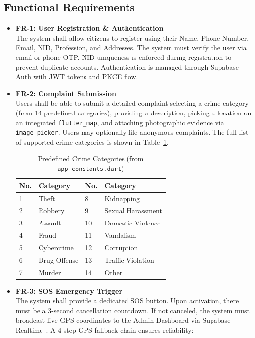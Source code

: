 \documentclass[12pt, a4paper, twoside, openany]{report}
\begin{document}
\subsection{Functional Requirements}
\begin{itemize}[label={}, itemsep=1em]
    \item \textbf{FR-1: User Registration \& Authentication}\\
    The system shall allow citizens to register using their Name, Phone Number, Email, NID, Profession, and Addresses. The system must verify the user via email or phone OTP. NID uniqueness is enforced during registration to prevent duplicate accounts. Authentication is managed through Supabase Auth with JWT tokens and PKCE flow.
    \item \textbf{FR-2: Complaint Submission}\\
    Users shall be able to submit a detailed complaint selecting a crime category (from 14 predefined categories), providing a description, picking a location on an integrated \texttt{flutter\_map}, and attaching photographic evidence via \texttt{image\_picker}. Users may optionally file anonymous complaints. The full list of supported crime categories is shown in Table~\ref{tab:categories}.
    \begin{table}[ht]
    \centering
    \caption{Predefined Crime Categories (from \texttt{app\_constants.dart})}
    \label{tab:categories}
    \begin{tabularx}{\textwidth}{X l X l}
    \toprule
    \textbf{No.} & \textbf{Category} & \textbf{No.} & \textbf{Category} \\
    \midrule
    1 & Theft & 8 & Kidnapping \\
    2 & Robbery & 9 & Sexual Harassment \\
    3 & Assault & 10 & Domestic Violence \\
    4 & Fraud & 11 & Vandalism \\
    5 & Cybercrime & 12 & Corruption \\
    6 & Drug Offense & 13 & Traffic Violation \\
    7 & Murder & 14 & Other \\
    \bottomrule
    \end{tabularx}
    \end{table}
    \item \textbf{FR-3: SOS Emergency Trigger}\\
    The system shall provide a dedicated SOS button. Upon activation, there must be a 3-second cancellation countdown. If not canceled, the system must broadcast live GPS coordinates to the Admin Dashboard via Supabase Realtime~\cite{realtime, sockets}. A 4-step GPS fallback chain ensures reliability:

\end{itemize}
\end{document}
